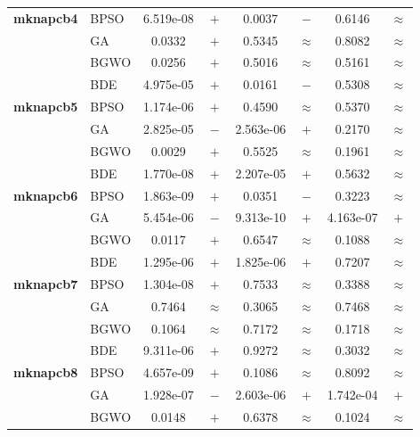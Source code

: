 \begin{table}[htbp]
\begin{tabular*}{\textwidth}{@{\extracolsep{\fill}}llcccccc@{}}
    \midrule
    \textbf{mknapcb4}  & BPSO  & 6.519e-08 & $+$ &    0.0037 & $-$ &    0.6146 & $\approx$ \\
                       & GA    &    0.0332 & $+$ &    0.5345 & $\approx$ &    0.8082 & $\approx$ \\
                       & BGWO  &    0.0256 & $+$ &    0.5016 & $\approx$ &    0.5161 & $\approx$ \\
                       & BDE   & 4.975e-05 & $+$ &    0.0161 & $-$ &    0.5308 & $\approx$ \\
    \midrule
    \textbf{mknapcb5}  & BPSO  & 1.174e-06 & $+$ &    0.4590 & $\approx$ &    0.5370 & $\approx$ \\
                       & GA    & 2.825e-05 & $-$ & 2.563e-06 & $+$ &    0.2170 & $\approx$ \\
                       & BGWO  &    0.0029 & $+$ &    0.5525 & $\approx$ &    0.1961 & $\approx$ \\
                       & BDE   & 1.770e-08 & $+$ & 2.207e-05 & $+$ &    0.5632 & $\approx$ \\
    \midrule
    \textbf{mknapcb6}  & BPSO  & 1.863e-09 & $+$ &    0.0351 & $-$ &    0.3223 & $\approx$ \\
                       & GA    & 5.454e-06 & $-$ & 9.313e-10 & $+$ & 4.163e-07 & $+$ \\
                       & BGWO  &    0.0117 & $+$ &    0.6547 & $\approx$ &    0.1088 & $\approx$ \\
                       & BDE   & 1.295e-06 & $+$ & 1.825e-06 & $+$ &    0.7207 & $\approx$ \\
    \midrule
    \textbf{mknapcb7}  & BPSO  & 1.304e-08 & $+$ &    0.7533 & $\approx$ &    0.3388 & $\approx$ \\
                       & GA    &    0.7464 & $\approx$ &    0.3065 & $\approx$ &    0.7468 & $\approx$ \\
                       & BGWO  &    0.1064 & $\approx$ &    0.7172 & $\approx$ &    0.1718 & $\approx$ \\
                       & BDE   & 9.311e-06 & $+$ &    0.9272 & $\approx$ &    0.3032 & $\approx$ \\
    \midrule
    \textbf{mknapcb8}  & BPSO  & 4.657e-09 & $+$ &    0.1086 & $\approx$ &    0.8092 & $\approx$ \\
                       & GA    & 1.928e-07 & $-$ & 2.603e-06 & $+$ & 1.742e-04 & $+$ \\
                       & BGWO  &    0.0148 & $+$ &    0.6378 & $\approx$ &    0.1024 & $\approx$ \\

\end{tabular*}
\end{table}
